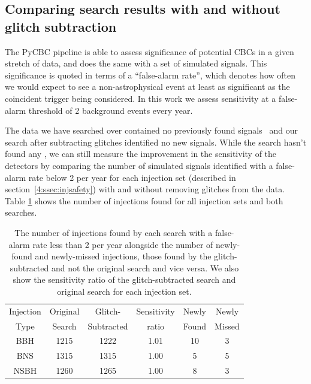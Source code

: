 \subsection{Comparing search results with and without glitch subtraction}

The PyCBC pipeline is able to assess significance of potential CBCs in a given stretch of data, and does the same with a set of simulated signals. This significance is quoted in terms of a ``false-alarm rate'', which denotes how often we would expect to see a non-astrophysical event at least as significant as the coincident trigger being considered. In this work we assess sensitivity at a false-alarm threshold of 2 background events every year.

The data we have searched over contained no previously found \gw{} signals~\cite{gwtc3:2023} and our search after subtracting \scl{} glitches identified no new \gw{} signals. While the search hasn't found any \gws{}, we can still measure the improvement in the sensitivity of the detectors by comparing the number of simulated signals identified with a false-alarm rate below 2 per year for each injection set (described in section~\ref{4:ssec:injsafety}) with and without removing glitches from the data. Table \ref{4:tab:found_injs} shows the number of injections found for all injection sets and both searches.
%
\begin{table}[tb]
\centering
\caption{\label{4:tab:found_injs}The number of injections found by each search with a false-alarm rate less than 2 per year alongside the number of newly-found and newly-missed injections, those found by the glitch-subtracted and not the original search and vice versa. We also show the sensitivity ratio of the glitch-subtracted search and original search for each injection set.} 
\footnotesize
\renewcommand{\arraystretch}{1.2}
\begin{tabular}{@{}cccccc}
\hline
Injection & Original  & Glitch- & Sensitivity & Newly & Newly \\
Type & Search & Subtracted & ratio & Found & Missed \\
\hline
BBH & 1215 & 1222 & 1.01 & 10 & 3 \\
BNS & 1315 & 1315 & 1.00 & 5 & 5 \\
NSBH & 1260 & 1265 & 1.00 & 8 & 3 \\
\hline
\end{tabular}


\end{table}

